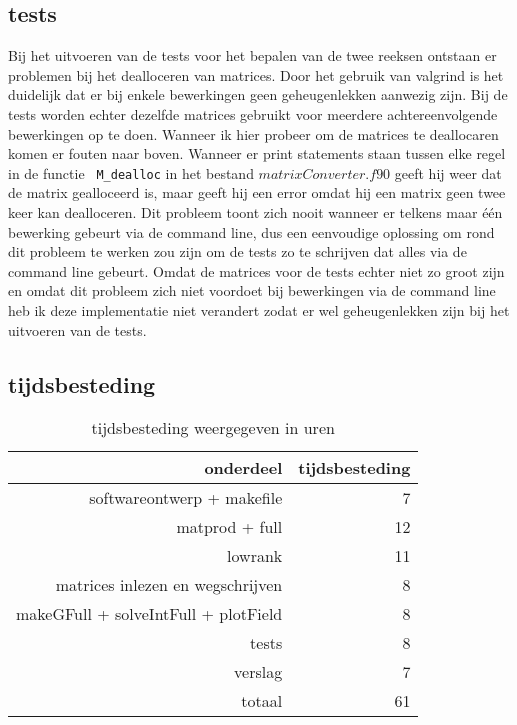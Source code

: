 \documentclass[a4paper]{article}
\begin{document}
\subsection*{tests}
Bij het uitvoeren van de tests voor het bepalen van de twee reeksen ontstaan er problemen bij het dealloceren van matrices. Door het gebruik van valgrind is het duidelijk dat er bij enkele bewerkingen geen geheugenlekken aanwezig zijn. Bij de tests worden echter dezelfde matrices gebruikt voor meerdere achtereenvolgende bewerkingen op te doen. Wanneer ik hier probeer om de matrices te deallocaren komen er fouten naar boven. Wanneer er print statements staan tussen elke regel in de functie \verb! M_dealloc! in het bestand \(matrixConverter.f90\) geeft hij weer dat de matrix gealloceerd is, maar geeft hij een error omdat hij een matrix geen twee keer kan dealloceren. Dit probleem toont zich nooit wanneer er telkens maar \'e\'en bewerking gebeurt via de command line, dus een eenvoudige oplossing om rond dit probleem te werken zou zijn om de tests zo te schrijven dat alles via de command line gebeurt. Omdat de matrices voor de tests echter niet zo groot zijn en omdat dit probleem zich niet voordoet bij bewerkingen via de command line heb ik deze implementatie niet verandert zodat er wel geheugenlekken zijn bij het uitvoeren van de tests.

\subsection*{tijdsbesteding}

\begin{table}
\begin{center}
\begin{tabular}{|r||r|}
\hline
onderdeel & tijdsbesteding \\\hline    
\hline
softwareontwerp + makefile & 7 \\\hline
matprod + full & 12 \\\hline
lowrank & 11 \\\hline
matrices inlezen en wegschrijven & 8 \\\hline
makeGFull + solveIntFull + plotField & 8 \\\hline
tests & 8 \\\hline
verslag & 7 \\\hline
\hline
totaal & 61 \\\hline
\end{tabular}
\end{center}
\caption{tijdsbesteding weergegeven in uren}
\label{tijdsbesteding}
\end{table}
\end{document}
